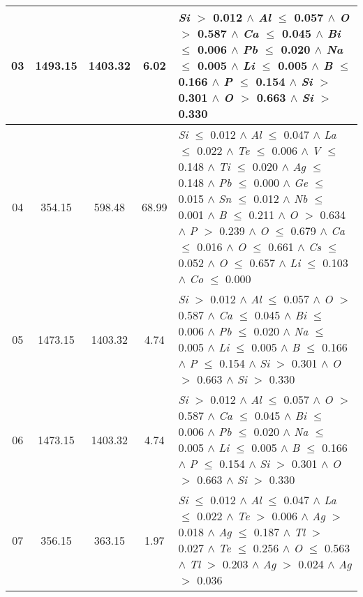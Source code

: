 \begin{table}[!htbp]
\begin{tabular}{ccccm{}}
		\hline
		03 & 1493.15 & 1403.32 & 6.02 & \textit{Si} $>$ 0.012 $\wedge$ \textit{Al} $\le$ 0.057 $\wedge$ \textit{O} $>$ 0.587 $\wedge$ \textit{Ca} $\le$ 0.045 $\wedge$ \textit{Bi} $\le$ 0.006 $\wedge$ \textit{Pb} $\le$ 0.020 $\wedge$ \textit{Na} $\le$ 0.005 $\wedge$ \textit{Li} $\le$ 0.005 $\wedge$ \textit{B} $\le$ 0.166 $\wedge$ \textit{P} $\le$ 0.154 $\wedge$ \textit{Si} $>$ 0.301 $\wedge$ \textit{O} $>$ 0.663 $\wedge$ \textit{Si} $>$ 0.330\\
		\hline
		04 & 354.15 & 598.48 & 68.99 & \textit{Si} $\le$ 0.012 $\wedge$ \textit{Al} $\le$ 0.047 $\wedge$ \textit{La} $\le$ 0.022 $\wedge$ \textit{Te} $\le$ 0.006 $\wedge$ \textit{V} $\le$ 0.148 $\wedge$ \textit{Ti} $\le$ 0.020 $\wedge$ \textit{Ag} $\le$ 0.148 $\wedge$ \textit{Pb} $\le$ 0.000 $\wedge$ \textit{Ge} $\le$ 0.015 $\wedge$ \textit{Sn} $\le$ 0.012 $\wedge$ \textit{Nb} $\le$ 0.001 $\wedge$ \textit{B} $\le$ 0.211 $\wedge$ \textit{O} $>$ 0.634 $\wedge$ \textit{P} $>$ 0.239 $\wedge$ \textit{O} $\le$ 0.679 $\wedge$ \textit{Ca} $\le$ 0.016 $\wedge$ \textit{O} $\le$ 0.661 $\wedge$ \textit{Cs} $\le$ 0.052 $\wedge$ \textit{O} $\le$ 0.657 $\wedge$ \textit{Li} $\le$ 0.103 $\wedge$ \textit{Co} $\le$ 0.000\\
		\hline
		05 & 1473.15 & 1403.32 & 4.74 & \textit{Si} $>$ 0.012 $\wedge$ \textit{Al} $\le$ 0.057 $\wedge$ \textit{O} $>$ 0.587 $\wedge$ \textit{Ca} $\le$ 0.045 $\wedge$ \textit{Bi} $\le$ 0.006 $\wedge$ \textit{Pb} $\le$ 0.020 $\wedge$ \textit{Na} $\le$ 0.005 $\wedge$ \textit{Li} $\le$ 0.005 $\wedge$ \textit{B} $\le$ 0.166 $\wedge$ \textit{P} $\le$ 0.154 $\wedge$ \textit{Si} $>$ 0.301 $\wedge$ \textit{O} $>$ 0.663 $\wedge$ \textit{Si} $>$ 0.330\\
		\hline
		06 & 1473.15 & 1403.32 & 4.74 & \textit{Si} $>$ 0.012 $\wedge$ \textit{Al} $\le$ 0.057 $\wedge$ \textit{O} $>$ 0.587 $\wedge$ \textit{Ca} $\le$ 0.045 $\wedge$ \textit{Bi} $\le$ 0.006 $\wedge$ \textit{Pb} $\le$ 0.020 $\wedge$ \textit{Na} $\le$ 0.005 $\wedge$ \textit{Li} $\le$ 0.005 $\wedge$ \textit{B} $\le$ 0.166 $\wedge$ \textit{P} $\le$ 0.154 $\wedge$ \textit{Si} $>$ 0.301 $\wedge$ \textit{O} $>$ 0.663 $\wedge$ \textit{Si} $>$ 0.330\\
		\hline
		07 & 356.15 & 363.15 & 1.97 & \textit{Si} $\le$ 0.012 $\wedge$ \textit{Al} $\le$ 0.047 $\wedge$ \textit{La} $\le$ 0.022 $\wedge$ \textit{Te} $>$ 0.006 $\wedge$ \textit{Ag} $>$ 0.018 $\wedge$ \textit{Ag} $\le$ 0.187 $\wedge$ \textit{Tl} $>$ 0.027 $\wedge$ \textit{Te} $\le$ 0.256 $\wedge$ \textit{O} $\le$ 0.563 $\wedge$ \textit{Tl} $>$ 0.203 $\wedge$ \textit{Ag} $>$ 0.024 $\wedge$ \textit{Ag} $>$ 0.036\\

\end{tabular}
\end{table}

